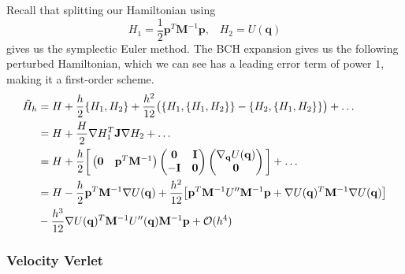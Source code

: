 \documentclass{article}
\begin{document}
      Recall that splitting our Hamiltonian using 
      \begin{equation}
        H_1 = \frac{1}{2} \mathbf{p}^T \mathbf{M}^{-1} \mathbf{p}, \;\;\; H_2 = U(\mathbf{q})
      \end{equation}
      gives us the symplectic Euler method. The BCH expansion gives us the following perturbed Hamiltonian, which we can see has a leading error term of power $1$, making it a first-order scheme. 
      \begin{align*}
        \Tilde{H}_h & = H + \frac{h}{2} \{H_1, H_2\} + \frac{h^2}{12} \big( \{H_1, \{H_1, H_2\}\} - \{ H_2, \{ H_1, H_2\}\} \big) + \ldots \\
        & = H + \frac{H}{2} \nabla H_1^T \mathbf{J} \nabla H_2 + \ldots \\
        & = H + \frac{h}{2} \bigg[ \begin{pmatrix} \mathbf{0} & \mathbf{p}^T \mathbf{M}^{-1} \end{pmatrix} \begin{pmatrix} \mathbf{0} & \mathbf{I} \\ -\mathbf{I} & \mathbf{0} \end{pmatrix} \begin{pmatrix} \nabla_\mathbf{q} U(\mathbf{q}) \\ \mathbf{0} \end{pmatrix} \bigg] + \ldots \\ 
        & = H - \frac{h}{2} \mathbf{p}^T \mathbf{M}^{-1} \nabla U(\mathbf{q}) + \frac{h^2}{12} \big[ \mathbf{p}^T \mathbf{M}^{-1} U^{\prime\prime} \mathbf{M}^{-1} \mathbf{p} + \nabla U(\mathbf{q})^T \mathbf{M}^{-1} \nabla U(\mathbf{q}) \big] \\
        & - \frac{h^3}{12} \nabla U (\mathbf{q})^T \mathbf{M}^{-1} U^{\prime\prime} (\mathbf{q}) \mathbf{M}^{-1} \mathbf{p} + \mathcal{O}(h^4)
      \end{align*}

    \subsubsection{Velocity Verlet}
\end{document}
